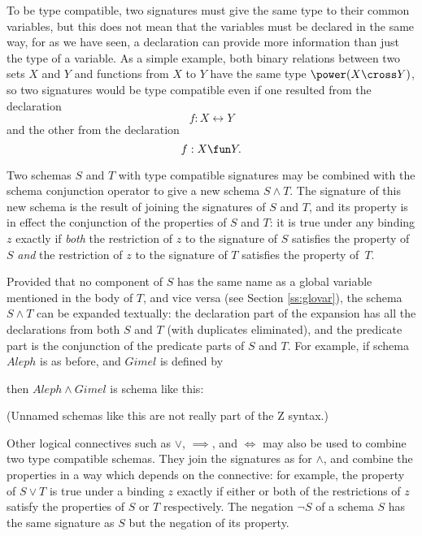 To be type compatible, two signatures must give the same type to their
common variables, but this does not mean that the variables must be
declared in the same way, for as we have seen, a declaration can
provide more information than just the type of a variable. As a simple
example, both binary relations between two sets $X$ and $Y$ and functions
from $X$ to $Y$ have the same type $\power(X \cross Y)$, so two
signatures would be type compatible even if one resulted from the
declaration
\[ f: X \rel Y \]
and the other from the declaration
\[ f: X \fun Y. \]

\new Two schemas $S$ and $T$ with type compatible signatures may be
combined with the schema conjunction
operator to give a new schema $S \land T$.  The signature of this
new schema is the result of joining the signatures of $S$ and $T$,
and its property is in effect the conjunction of the properties of
$S$ and $T$: it is true under any binding $z$ exactly if {\em
both\/} the restriction of $z$ to the signature of $S$ satisfies the
property of $S$ {\em and\/} the restriction of $z$ to the signature
of $T$ satisfies the property of~$T$.

Provided that no component of $S$ has the same name as a global
variable mentioned in the body of $T$, and vice versa (see Section
\ref{ss:glovar}), the schema $S \land T$ can be expanded textually:
the declaration part of the expansion has all the declarations from
both $S$ and $T$ (with duplicates eliminated), and the
predicate part is the conjunction of the predicate parts of $S$ and
$T$.  For example, if schema $Aleph$ is as before, and $Gimel$ is
defined by
then $Aleph \land Gimel$ is schema like this:
(Unnamed schemas like this are not really part of the Z syntax.)

Other logical connectives such as $\lor$, $\implies$, and $\iff$ may
also be used to combine two type compatible schemas. They join the
signatures as for $\land$, and combine the properties in a way which
depends on the connective: for example, the
property of $S \lor T$ is true under a
binding $z$ exactly if either or both of the restrictions of $z$
satisfy the properties of $S$ or $T$ respectively.  The
negation $\lnot S$ of a schema $S$ has
the same signature as $S$ but the negation of its property.

